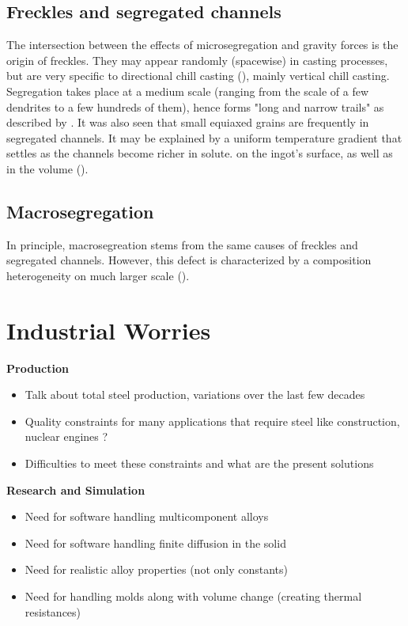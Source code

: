 \subsection*{Freckles and segregated channels} 
The intersection between the effects of microsegregation and gravity forces is the origin of freckles. They may appear 
randomly (spacewise) in casting processes, but are very specific to directional chill casting (\cite{giamei_nature_1970}), mainly vertical chill casting. 
Segregation takes place at a medium scale (ranging from the scale of a few dendrites to a few hundreds of them), hence forms "long and narrow trails" as described by \citet{felicelli_simulation_1991}. It was also seen that small equiaxed grains are frequently in segregated channels. It may be explained by a uniform temperature
gradient that settles as the channels become richer in solute. 
on the ingot's surface, as well as in the volume ().

\subsection*{Macrosegregation}
In principle, macrosegreation stems from the same causes of freckles and segregated channels. However, this defect is characterized by a composition heterogeneity on much larger scale (). 

\section*{Industrial Worries}
\textbf{Production}

\begin{itemize}
\item Talk about total steel production, variations over the last few decades
\item Quality constraints for many applications that require steel like construction, nuclear engines ? 
\item Difficulties to meet these constraints and what are the present solutions
\end{itemize}
\textbf{Research and Simulation}
\begin{itemize}
\item Need for software handling multicomponent alloys
\item Need for software handling finite diffusion in the solid
\item Need for realistic alloy properties (not only constants)
\item Need for handling molds along with volume change (creating thermal resistances)
\end{itemize}

